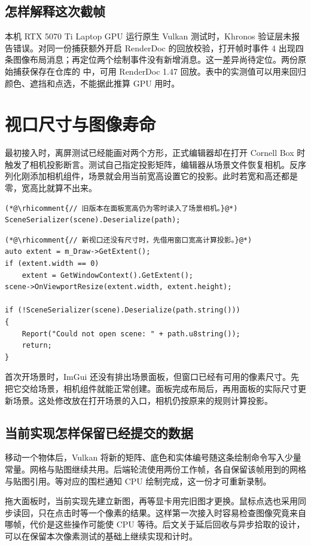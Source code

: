 \subsection{怎样解释这次截帧}
本机 RTX 5070 Ti Laptop GPU 运行原生 Vulkan 测试时，Khronos 验证层未报告错误。对同一份捕获额外开启 RenderDoc 的回放校验，打开帧时事件 4 出现四条图像布局消息；再定位两个绘制事件没有新增消息。这一差异尚待定位。两份原始捕获保存在仓库的  中，可用 RenderDoc 1.47 回放。表中的实测值可以用来回归颜色、遮挡和点选，不能据此推算 GPU 用时。

\clearpage
\section{视口尺寸与图像寿命}\label{impl:fix}
最初接入时，离屏测试已经能画对两个方形，正式编辑器却在打开 Cornell Box 时触发了相机投影断言。测试自己指定投影矩阵，编辑器从场景文件恢复相机。反序列化刚添加相机组件，场景就会用当前宽高设置它的投影。此时若宽和高还都是零，宽高比就算不出来。

\begin{lstlisting}
(*@\rhicomment{// 旧版本在面板宽高仍为零时读入了场景相机。}@*)
SceneSerializer(scene).Deserialize(path);
\end{lstlisting}

\begin{lstlisting}
(*@\rhicomment{// 新视口还没有尺寸时，先借用窗口宽高计算投影。}@*)
auto extent = m_Draw->GetExtent();
if (extent.width == 0)
    extent = GetWindowContext().GetExtent();
scene->OnViewportResize(extent.width, extent.height);

if (!SceneSerializer(scene).Deserialize(path.string()))
{
    Report("Could not open scene: " + path.u8string());
    return;
}
\end{lstlisting}

首次开场景时，ImGui 还没有排出场景面板，但窗口已经有可用的像素尺寸。先把它交给场景，相机组件就能正常创建。面板完成布局后，再用面板的实际尺寸更新场景。这处修改放在打开场景的入口，相机仍按原来的规则计算投影。

\subsection{当前实现怎样保留已经提交的数据}
移动一个物体后，Vulkan 将新的矩阵、底色和实体编号随这条绘制命令写入少量常量。网格与贴图继续共用。后端轮流使用两份工作帧，各自保留该帧用到的网格与贴图引用。等对应的围栏通知 CPU 绘制完成，这一份才可重新录制。

拖大面板时，当前实现先建立新图，再等显卡用完旧图才更换。鼠标点选也采用同步读回，只在点击时等一个像素的结果。这样第一次接入时容易检查图像究竟来自哪帧，代价是这些操作可能使 CPU 等待。后文关于延后回收与异步拾取的设计，可以在保留本次像素测试的基础上继续实现和计时。

